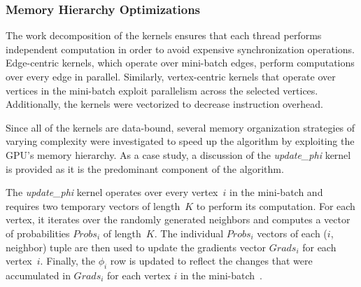 
\subsubsection{Memory Hierarchy Optimizations}
\label{gpu-design}

The work decomposition of the kernels ensures that each thread performs
independent computation in order to avoid expensive synchronization operations.
Edge-centric kernels, which operate over mini-batch edges, perform computations
over every edge in parallel.  Similarly, vertex-centric kernels that operate
over vertices in the mini-batch exploit parallelism across the selected
vertices.
Additionally, the kernels were vectorized to decrease instruction overhead.


Since all of the kernels are data-bound, several memory organization strategies
of varying complexity were investigated to speed up the algorithm by
exploiting the GPU's memory hierarchy.
As a case study, a discussion of the \textit{update\_phi} kernel is provided as it is
the predominant component of the algorithm.

The \textit{update\_phi} kernel operates over every vertex~$i$ in the mini-batch and
requires two temporary vectors of length~$K$ to perform its computation. For
each vertex, it iterates over the randomly generated neighbors and computes a
vector of probabilities $Probs_i$ of length~$K$. The individual $Probs_i$ vectors
of each ($i$, neighbor) tuple are then used to update the gradients vector
$Grads_i$ for each vertex~$i$. Finally, the $\phi_i$ row is updated to
reflect the changes that were accumulated in $Grads_i$ for each vertex $i$ in the
mini-batch~\Minibatch.

